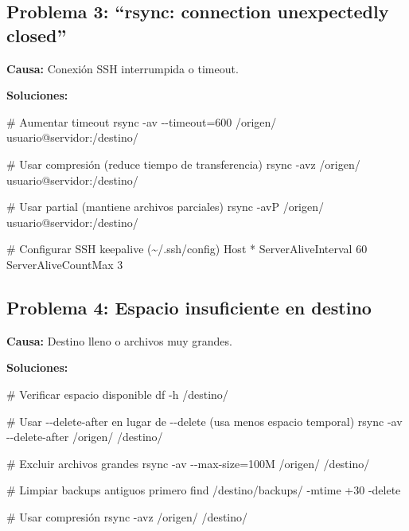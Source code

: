 \documentclass[
  doc,
  floatsintext,
  longtable,
  a4paper,
  nolmodern,
  notxfonts,
  notimes,
  12pt,
  colorlinks=true,linkcolor=blue,citecolor=blue,urlcolor=blue]{apa7}
\newenvironment{Shaded}{\begin{snugshade}}{\end{snugshade}}
\newcommand{\AttributeTok}[1]{\textcolor[rgb]{0.40,0.45,0.13}{#1}}
\newcommand{\CommentTok}[1]{\textcolor[rgb]{0.37,0.37,0.37}{#1}}
\newcommand{\ExtensionTok}[1]{\textcolor[rgb]{0.00,0.23,0.31}{#1}}
\newcommand{\FunctionTok}[1]{\textcolor[rgb]{0.28,0.35,0.67}{#1}}
\newcommand{\NormalTok}[1]{\textcolor[rgb]{0.00,0.23,0.31}{#1}}
\newcommand{\OperatorTok}[1]{\textcolor[rgb]{0.37,0.37,0.37}{#1}}
\newcommand{\PreprocessorTok}[1]{\textcolor[rgb]{0.68,0.00,0.00}{#1}}
\begin{document}
\subsection{Problema 3: ``rsync: connection unexpectedly
closed''}\label{problema-3-rsync-connection-unexpectedly-closed}

\textbf{Causa:} Conexión SSH interrumpida o timeout.

\textbf{Soluciones:}

\begin{Shaded}
\begin{Highlighting}[]
\CommentTok{\# Aumentar timeout}
\FunctionTok{rsync} \AttributeTok{{-}av} \AttributeTok{{-}{-}timeout}\OperatorTok{=}\NormalTok{600 /origen/ usuario@servidor:/destino/}

\CommentTok{\# Usar compresión (reduce tiempo de transferencia)}
\FunctionTok{rsync} \AttributeTok{{-}avz}\NormalTok{ /origen/ usuario@servidor:/destino/}

\CommentTok{\# Usar partial (mantiene archivos parciales)}
\FunctionTok{rsync} \AttributeTok{{-}avP}\NormalTok{ /origen/ usuario@servidor:/destino/}

\CommentTok{\# Configurar SSH keepalive (\textasciitilde{}/.ssh/config)}
\ExtensionTok{Host} \PreprocessorTok{*}
    \ExtensionTok{ServerAliveInterval}\NormalTok{ 60}
    \ExtensionTok{ServerAliveCountMax}\NormalTok{ 3}
\end{Highlighting}
\end{Shaded}

\subsection{Problema 4: Espacio insuficiente en
destino}\label{problema-4-espacio-insuficiente-en-destino}

\textbf{Causa:} Destino lleno o archivos muy grandes.

\textbf{Soluciones:}

\begin{Shaded}
\begin{Highlighting}[]
\CommentTok{\# Verificar espacio disponible}
\FunctionTok{df} \AttributeTok{{-}h}\NormalTok{ /destino/}

\CommentTok{\# Usar {-}{-}delete{-}after en lugar de {-}{-}delete (usa menos espacio temporal)}
\FunctionTok{rsync} \AttributeTok{{-}av} \AttributeTok{{-}{-}delete{-}after}\NormalTok{ /origen/ /destino/}

\CommentTok{\# Excluir archivos grandes}
\FunctionTok{rsync} \AttributeTok{{-}av} \AttributeTok{{-}{-}max{-}size}\OperatorTok{=}\NormalTok{100M /origen/ /destino/}

\CommentTok{\# Limpiar backups antiguos primero}
\FunctionTok{find}\NormalTok{ /destino/backups/ }\AttributeTok{{-}mtime}\NormalTok{ +30 }\AttributeTok{{-}delete}

\CommentTok{\# Usar compresión}
\FunctionTok{rsync} \AttributeTok{{-}avz}\NormalTok{ /origen/ /destino/}
\end{Highlighting}
\end{Shaded}
\end{document}
